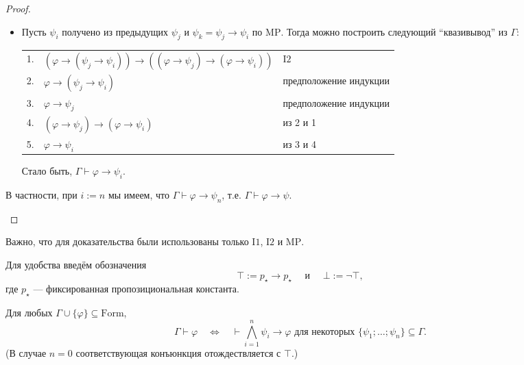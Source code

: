 \documentclass[12pt,a4paper]{article}
\newcommand{\Formul}{\ensuremath{\mathrm{Form}}\xspace}
\begin{document}
\begin{proof}
\begin{itemize}
\begin{itemize}
                    \item Пусть $\psi_i$ получено из предыдущих $\psi_j$ и $\psi_k = \psi_j \rightarrow \psi_i$ по $\mathrm{MP}$. Тогда можно построить следующий ``квазивывод'' из $\Gamma$:
                        \begin{center}
                            \begin{tabular}{rll}
                                1.& $(\varphi \rightarrow (\psi_j \rightarrow \psi_i)) \rightarrow ((\varphi \rightarrow \psi_j) \rightarrow (\varphi \rightarrow \psi_i))$& $\mathrm{I2}$\\
                                2.& $\varphi \rightarrow (\psi_j \rightarrow \psi_i)$& предположение индукции\\
                                3.& $\varphi \rightarrow \psi_j$& предположение индукции\\
                                4.& $(\varphi \rightarrow \psi_j) \rightarrow (\varphi \rightarrow \psi_i)$& из 2 и 1\\
                                5.& $\varphi \rightarrow \psi_i$& из 3 и 4\\
                            \end{tabular}
                        \end{center}
                        Стало быть, $\Gamma \vdash \varphi \rightarrow \psi_i$.
                \end{itemize}

                В частности, при $i := n$ мы имеем, что $\Gamma \vdash \varphi \rightarrow \psi_n$, т.е. $\Gamma \vdash \varphi \rightarrow \psi$.
        \end{itemize}
    \end{proof}

    \begin{remark}
        Важно, что для доказательства были использованы только $\mathrm{I1}$, $\mathrm{I2}$ и $\mathrm{MP}$.
    \end{remark}

    \begin{definition}
        Для удобства введём обозначения
        \[\top := p_\star \rightarrow p_\star \quad \text{ и } \quad \bot := \neg \top,\]
        где $p_\star$ --- фиксированная пропозициональная константа.
    \end{definition}

    \begin{corollary}
        Для любых $\Gamma \cup \{\varphi\} \subseteq \Formul$,
        \[
            \Gamma \vdash \varphi
            \quad \Longleftrightarrow \quad
            \vdash \bigwedge_{i=1}^n \psi_i \rightarrow \varphi \text{ для некоторых } \{\psi_1; \dots; \psi_n\} \subseteq \Gamma.
        \]
        (В случае $n=0$ соответствующая конъюнкция отождествляется с $\top$.)
    \end{corollary}
\end{document}
